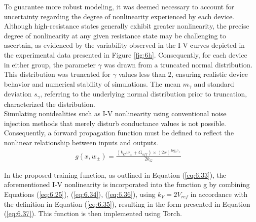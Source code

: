 
\noindent To guarantee more robust modeling, it was deemed necessary to account for uncertainty regarding the degree of nonlinearity experienced by each device. Although high-resistance states generally exhibit greater nonlinearity, the precise degree of nonlinearity at any given resistance state may be challenging to ascertain, as evidenced by the variability observed in the I-V curves depicted in the experimental data presented in Figure \ref{fig:6h}. Consequently, for each device in either group, the parameter $\gamma$ was drawn from a truncated normal distribution. This distribution was truncated for $\gamma$ values less than 2, ensuring realistic device behavior and numerical stability of simulations. The mean $m_\gamma$ and standard deviation $s_\gamma$, referring to the underlying normal distribution prior to truncation, characterized the distribution. \\

\noindent Simulating nonidealities such as I-V nonlinearity using conventional noise injection methods that merely disturb conductance values is not possible. Consequently, a forward propagation function must be defined to reflect the nonlinear relationship between inputs and outputs.
\begin{align}
g(x, w_\pm) = \frac{\left( k_Gw_\pm + G_{off}\right) \times \left( 2x \right)^{log_2\gamma_\pm}}{2k_G} \label{eq:6.37}
\end{align}

\noindent In the proposed training function, as outlined in Equation (\ref{eq:6.33}), the aforementioned I-V nonlinearity is incorporated into the function g by combining Equations (\ref{eq:6.25}), (\ref{eq:6.34}), (\ref{eq:6.36}), using $k_V = 2V_{ref}$ in accordance with the definition in Equation (\ref{eq:6.35}), resulting in the form presented in Equation (\ref{eq:6.37}). This function is then implemented using Torch.\\


